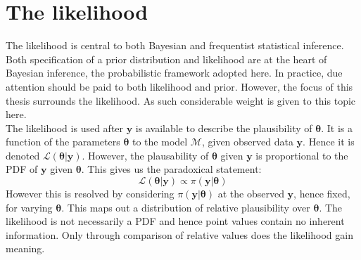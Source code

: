 \section{The likelihood}
The likelihood is central to both Bayesian and frequentist statistical inference. Both specification of a prior distribution and likelihood are at the heart of Bayesian inference, the probabilistic framework adopted here. In practice, due attention should be paid to both likelihood and prior. However, the focus of this thesis surrounds the likelihood. As such considerable weight is given to this topic here. \\

The likelihood is used after $\bm{y}$ is available to describe the plausibility of $\bm{\theta}$. It is a function of the parameters $\bm{\theta}$ to the model $\mathcal{M}$, given observed data $\bm{y}$. Hence it is denoted $\mathcal{L}(\bm{\theta}|\bm{y})$. However, the plausability of $\bm{\theta}$ given $\bm{y}$ is proportional to the PDF of $\bm{y}$ given $\bm{\theta}$. This gives us the paradoxical statement:
\begin{equation}
\mathcal{L}(\bm{\theta}|\bm{y}) \propto \pi(\bm{y}|\bm{\theta})
\label{likelihood_def}
\end{equation}
However this is resolved by considering $\pi(\bm{y}|\bm{\theta})$ at the observed $\bm{y}$, hence fixed, for varying $\bm{\theta}$. This maps out a distribution of relative plausibility over $\bm{\theta}$. The likelihood is not necessarily a PDF and hence point values contain no inherent information. Only through comparison of relative values does the likelihood gain meaning.\\

